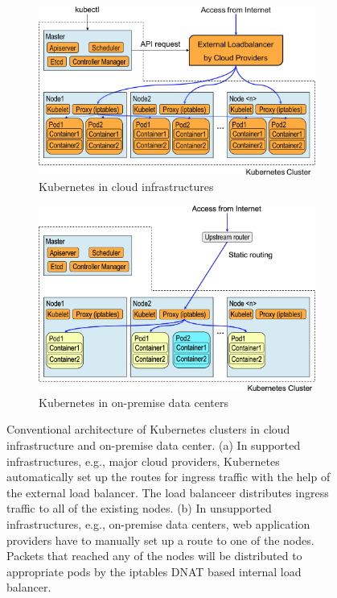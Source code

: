 \begin{figure}[tb]

  \begin{subfigure}[t]{\columnwidth}
    \centering
    \includegraphics[width=0.8\columnwidth]{Figs/K8sConventional}
    \caption{Kubernetes in cloud infrastructures}
    \label{fig:K8sConventional}
  \end{subfigure}

  \par\bigskip
  \par\bigskip

  \begin{subfigure}[t]{\columnwidth}
    \centering
    \includegraphics[width=0.8\columnwidth]{Figs/K8sConventional_bm}
    \caption{Kubernetes in on-premise data centers}
    \label{fig:K8sConventional_bm}
  \end{subfigure}

   \centering

  \begin{minipage}{1.0\columnwidth}
    \caption[Conventional architecture of Kubernetes clusters]
            {Conventional architecture of Kubernetes clusters in cloud infrastructure and on-premise data center.
(a) In supported infrastructures, e.g., major cloud providers, Kubernetes automatically set up the routes for ingress traffic with the help of the external load balancer.
The load balanceer distributes ingress traffic to all of the existing nodes.
(b) In unsupported infrastructures, e.g., on-premise data centers, web application providers have to manually set up a route to one of the nodes.
Packets that reached any of the nodes will be distributed to appropriate pods by the iptables DNAT based internal load balancer.
            }
  \end{minipage}

\end{figure}


